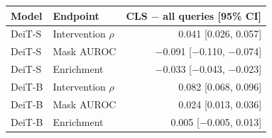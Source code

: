 \begin{tabular}{@{}llr@{}}
\toprule
Model & Endpoint & CLS $-$ all queries [95\% CI] \\
\midrule
DeiT-S & Intervention $\rho$ & 0.041 [0.026, 0.057] \\
DeiT-S & Mask AUROC & $-$0.091 [$-$0.110, $-$0.074] \\
DeiT-S & Enrichment & $-$0.033 [$-$0.043, $-$0.023] \\
DeiT-B & Intervention $\rho$ & 0.082 [0.068, 0.096] \\
DeiT-B & Mask AUROC & 0.024 [0.013, 0.036] \\
DeiT-B & Enrichment & 0.005 [$-$0.005, 0.013] \\
\bottomrule
\end{tabular}
